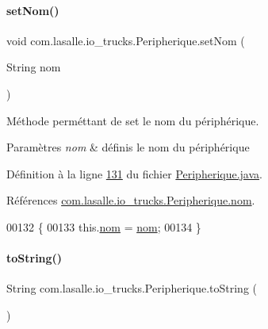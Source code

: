 \paragraph{\texorpdfstring{set\+Nom()}{setNom()}}
{\footnotesize\ttfamily void com.\+lasalle.\+io\+\_\+trucks.\+Peripherique.\+set\+Nom (\begin{DoxyParamCaption}\item[{String}]{nom }\end{DoxyParamCaption})}



Méthode perméttant de set le nom du périphérique. 


\begin{DoxyParams}{Paramètres}
{\em nom} & définis le nom du périphérique \\
\hline
\end{DoxyParams}


Définition à la ligne \hyperlink{_peripherique_8java_source_l00131}{131} du fichier \hyperlink{_peripherique_8java_source}{Peripherique.\+java}.



Références \hyperlink{_peripherique_8java_source_l00040}{com.\+lasalle.\+io\+\_\+trucks.\+Peripherique.\+nom}.


\begin{DoxyCode}
00132     \{
00133         this.\hyperlink{classcom_1_1lasalle_1_1io__trucks_1_1_peripherique_a57ad735952307998eddf5277be95ec95}{nom} = \hyperlink{classcom_1_1lasalle_1_1io__trucks_1_1_peripherique_a57ad735952307998eddf5277be95ec95}{nom};
00134     \}
\end{DoxyCode}
\mbox{\label{classcom_1_1lasalle_1_1io__trucks_1_1_peripherique_a3ce69dc3b561771d428523f8df08cbc9}} 
\paragraph{\texorpdfstring{to\+String()}{toString()}}
{\footnotesize\ttfamily String com.\+lasalle.\+io\+\_\+trucks.\+Peripherique.\+to\+String (\begin{DoxyParamCaption}{ }\end{DoxyParamCaption})}



